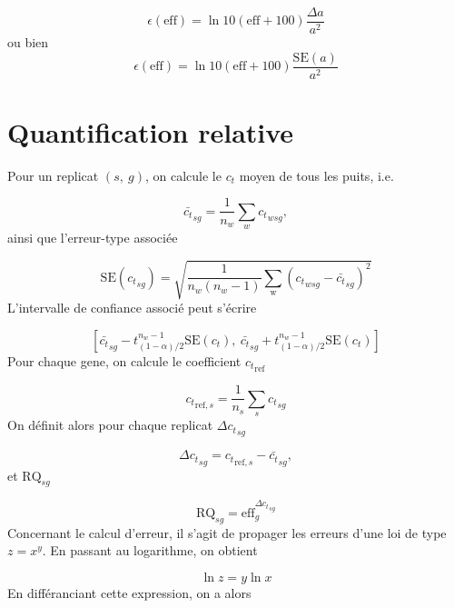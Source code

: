 \documentclass[a4paper,10pt]{article}
\begin{document}
\begin{equation}
 \epsilon(\text{eff}) = \ln 10(\text{eff}+100) \dfrac{\Delta a}{a^2}
\end{equation}
{\color{red} ou bien} 
\begin{equation}
 \epsilon(\text{eff}) = \ln 10(\text{eff}+100) \dfrac{\text{SE}(a)}{a^2}
\end{equation}


\section{Quantification relative}

Pour un replicat $(s,\ g)$, on calcule le $c_t$ moyen de tous les puits, i.e.

\begin{equation}
 {\bar{c_t}}_{sg} = \dfrac{1}{n_w}\sum_{w}{c_t}_{wsg},
\end{equation}
ainsi que l'erreur-type associée

\begin{equation}
 \text{SE} ({c_t}_{sg}) =
\sqrt{\dfrac{1}{n_w(n_w-1)}\sum_{\text{w}}
({c_t}_{wsg}-{\bar{c_t}}_{sg})^2}
\end{equation}
L'intervalle de confiance associé peut s'écrire

\begin{equation}
 \left[{\bar{c_t}}_{sg}-t_{(1-\alpha)/2}^{n_w-1}\text{SE}(c_t),\
{\bar{c_t}}_{sg}+t_{(1-\alpha)/2}^{n_w-1}\text{SE}(c_t)\right]
\end{equation}
Pour chaque gene, on calcule le coefficient ${c_t}_{\text{ref}}$

\begin{equation}
 {c_t}_{\text{ref},s} = \dfrac{1}{n_s}\sum_{s}{c_t}_{sg} 
\end{equation}
On définit alors pour chaque replicat ${\Delta c_t}_{sg}$

\begin{equation}
 {\Delta c_t}_{sg} = {c_t}_{\text{ref},s} - {\bar{c_t}}_{sg},
\end{equation}
et $\text{RQ}_{sg}$

\begin{equation}
 \text{RQ}_{sg} = \text{eff}_g^{{\Delta c_t}_{sg}}
\end{equation}
Concernant le calcul d'erreur, il s'agit de propager les erreurs d'une loi de
type $z=x^y$. En passant au logarithme, on obtient

\begin{equation}
 \ln z = y\ln x
\end{equation}
En différanciant cette expression, on a alors
\end{document}
